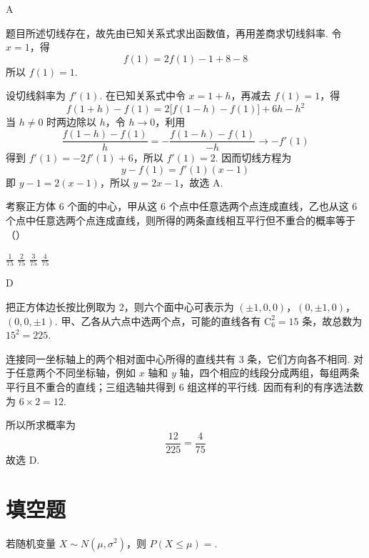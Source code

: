 \begin{answer}
A
\end{answer}

\begin{solution}
题目所述切线存在，故先由已知关系式求出函数值，再用差商求切线斜率. 令 \(x=1\)，得
\[
f(1)=2f(1)-1+8-8
\]
所以 \(f(1)=1\).

设切线斜率为 \(f'(1)\). 在已知关系式中令 \(x=1+h\)，再减去 \(f(1)=1\)，得
\[
f(1+h)-f(1)=2\bigl[f(1-h)-f(1)\bigr]+6h-h^2
\]
当 \(h\ne0\) 时两边除以 \(h\)，令 \(h\to0\)，利用
\[
\frac{f(1-h)-f(1)}{h}=-\frac{f(1-h)-f(1)}{-h}\longrightarrow-f'(1)
\]
得到 \(f'(1)=-2f'(1)+6\)，所以 \(f'(1)=2\). 因而切线方程为
\[
y-f(1)=f'(1)(x-1)
\]
即 \(y-1=2(x-1)\)，所以 \(y=2x-1\)，故选 A.
\end{solution}

\begin{problem}
考察正方体 6 个面的中心，甲从这 6 个点中任意选两个点连成直线，乙也从这 6 个点中任意选两个点连成直线，则所得的两条直线相互平行但不重合的概率等于（\quad）

\choices
    {\(\frac{1}{75}\)}
    {\(\frac{2}{75}\)}
    {\(\frac{3}{75}\)}
    {\(\frac{4}{75}\)}
\end{problem}

\begin{answer}
D
\end{answer}

\begin{solution}
把正方体边长按比例取为 \(2\)，则六个面中心可表示为
\((\pm1,0,0)\)，\((0,\pm1,0)\)，\((0,0,\pm1)\).
甲、乙各从六点中选两个点，可能的直线各有 \(\mathrm C_6^2=15\) 条，故总数为 \(15^2=225\).

连接同一坐标轴上的两个相对面中心所得的直线共有 \(3\) 条，它们方向各不相同. 对于任意两个不同坐标轴，例如 \(x\) 轴和 \(y\) 轴，四个相应的线段分成两组，每组两条平行且不重合的直线；三组选轴共得到 \(6\) 组这样的平行线. 因而有利的有序选法数为 \(6\times2=12\).

所以所求概率为
\[
\frac{12}{225}=\frac{4}{75}
\]
故选 D.
\end{solution}

\section{填空题}

\begin{problem}
若随机变量 \(X \sim N(\mu, \sigma^2)\)，则 \(P(X \leqslant \mu) =\)\fillinblank{}.
\end{problem}

